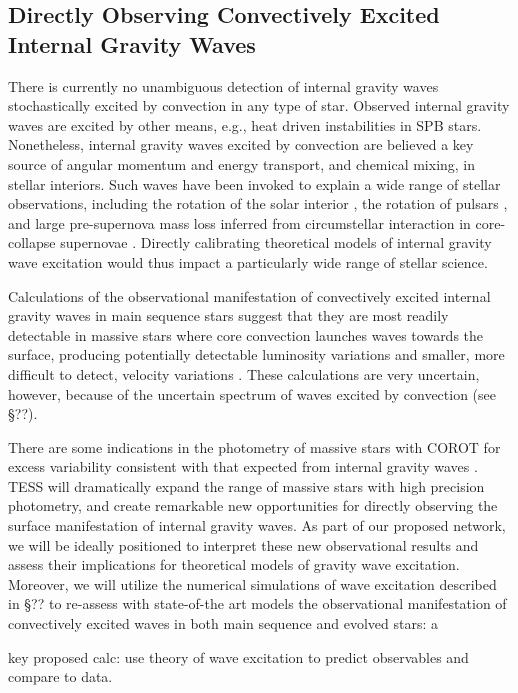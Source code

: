 \color{blue}
\subsection{Directly Observing Convectively Excited Internal Gravity Waves}

There is currently no unambiguous detection of  internal gravity waves stochastically excited by convection in any type of star.  Observed internal gravity waves  are excited by other means, e.g., heat driven instabilities in SPB stars. Nonetheless, internal gravity waves excited by convection are believed a key source of angular momentum and energy transport, and chemical mixing, in stellar interiors.   Such waves have been invoked to explain a wide range of stellar observations, including the rotation of the solar interior \citep{kumar1999}, the rotation of pulsars \citep{fuller2015}, and large pre-supernova mass loss inferred from circumstellar interaction in core-collapse supernovae \citep{qs2012}.   Directly calibrating theoretical models of internal gravity wave excitation would thus impact a particularly wide range of stellar science.

Calculations of the observational manifestation of convectively excited internal gravity waves in main sequence stars suggest that they are most readily detectable in massive stars where core convection launches waves towards the surface, producing potentially detectable luminosity variations and smaller, more difficult to detect, velocity variations \citep{samadi2010, shiode2013}.   These calculations are very uncertain, however, because of the uncertain spectrum of waves excited by convection (see \S ??).

There are some indications in the photometry of massive stars with COROT for excess variability consistent with that expected from internal gravity waves \citep{aerts2015}.   TESS will dramatically expand the range of massive stars with high precision photometry, and create remarkable new opportunities for directly observing the surface manifestation of internal gravity waves.   
As part of our proposed network, we will be ideally positioned to interpret these new observational results and assess their implications for theoretical models of gravity wave excitation.   Moreover, we will utilize the numerical simulations of wave excitation described in \S ?? to re-assess with state-of-the art models the observational manifestation of convectively excited waves in both main sequence and evolved stars:   a

key proposed calc:   use theory of wave excitation to predict observables and compare to data.

